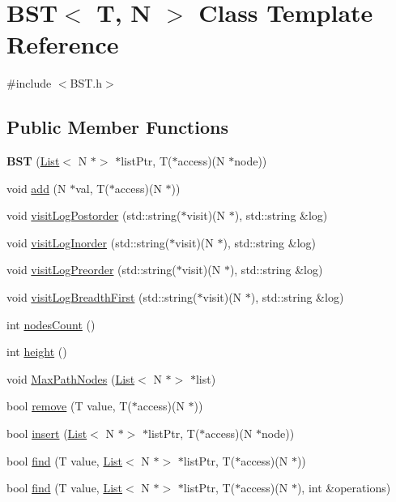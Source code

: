 \hypertarget{class_b_s_t}{}\section{B\+ST$<$ T, N $>$ Class Template Reference}
\label{class_b_s_t}


{\ttfamily \#include $<$B\+S\+T.\+h$>$}

\subsection*{Public Member Functions}
\begin{DoxyCompactItemize}
\item 
\mbox{\label{class_b_s_t_a926396322f01395ffccb4eeb6365fc44}} 
{\bfseries B\+ST} (\hyperlink{class_list}{List}$<$ N $\ast$$>$ $\ast$list\+Ptr, T($\ast$access)(N $\ast$node))
\item 
void \hyperlink{class_b_s_t_afc990532c54fba36b8501836b1834ac6}{add} (N $\ast$val, T($\ast$access)(N $\ast$))
\item 
void \hyperlink{class_b_s_t_a831b6fdcda13b7a353e03992b9c965b7}{visit\+Log\+Postorder} (std\+::string($\ast$visit)(N $\ast$), std\+::string \&log)
\item 
void \hyperlink{class_b_s_t_a04d669d91c9528c61f618d022999ea26}{visit\+Log\+Inorder} (std\+::string($\ast$visit)(N $\ast$), std\+::string \&log)
\item 
void \hyperlink{class_b_s_t_a7ed3924d6f70e52c7a6bc1d5bddbb31d}{visit\+Log\+Preorder} (std\+::string($\ast$visit)(N $\ast$), std\+::string \&log)
\item 
void \hyperlink{class_b_s_t_a3e958de8a85c1268b11006a3ed32a7bb}{visit\+Log\+Breadth\+First} (std\+::string($\ast$visit)(N $\ast$), std\+::string \&log)
\item 
int \hyperlink{class_b_s_t_a86fb81e20a21ef65e2b57e55d910d875}{nodes\+Count} ()
\item 
int \hyperlink{class_b_s_t_a84bfd35b9fdf74574ffcac8b33a129b3}{height} ()
\item 
void \hyperlink{class_b_s_t_a8ef035f46b23dbe48acf2e23a755eb83}{Max\+Path\+Nodes} (\hyperlink{class_list}{List}$<$ N $\ast$$>$ $\ast$list)
\item 
bool \hyperlink{class_b_s_t_aef5667b555733710dbe17aa7218e248d}{remove} (T value, T($\ast$access)(N $\ast$))
\item 
bool \hyperlink{class_b_s_t_ace5f293fc8c1816f257afc1c26334e51}{insert} (\hyperlink{class_list}{List}$<$ N $\ast$$>$ $\ast$list\+Ptr, T($\ast$access)(N $\ast$node))
\item 
bool \hyperlink{class_b_s_t_a5b31797d590b06f6ed2c68fc6161510b}{find} (T value, \hyperlink{class_list}{List}$<$ N $\ast$$>$ $\ast$list\+Ptr, T($\ast$access)(N $\ast$))
\item 
bool \hyperlink{class_b_s_t_a2ddd955621922fcbb75dc2920d4a479b}{find} (T value, \hyperlink{class_list}{List}$<$ N $\ast$$>$ $\ast$list\+Ptr, T($\ast$access)(N $\ast$), int \&operations)
\end{DoxyCompactItemize}


